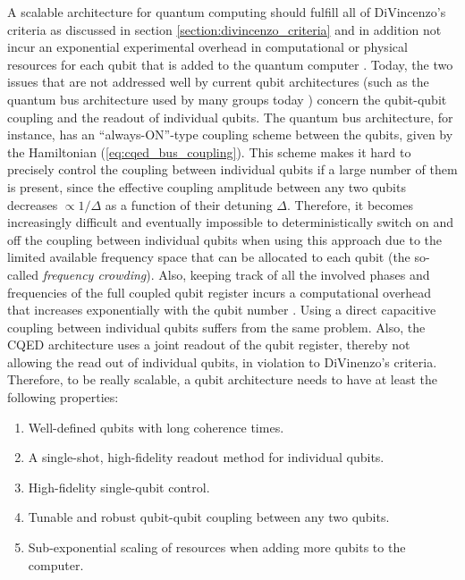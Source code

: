 A scalable architecture for quantum computing should fulfill all of DiVincenzo's criteria as discussed in section \ref{section:divincenzo_criteria} and in addition not incur an exponential experimental overhead in computational or physical resources for each qubit that is added to the quantum computer \citep{blume-kohout_climbing_2002}. Today, the two issues that are not addressed well by current qubit architectures (such as the quantum bus architecture used by many groups today \citep{dicarlo_demonstration_2009,wallraff_strong_2004}) concern the qubit-qubit coupling and the readout of individual qubits. The quantum bus architecture, for instance, has an ``always-ON''-type coupling scheme between the qubits, given by the Hamiltonian (\ref{eq:cqed_bus_coupling}). This scheme makes it hard to precisely control the coupling between individual qubits if a large number of them is present, since the effective coupling amplitude between any two qubits decreases $\propto 1/\Delta$ as a function of their detuning $\Delta$. Therefore, it becomes increasingly difficult and eventually impossible to deterministically switch on and off the coupling between individual qubits when using this approach due to the limited available frequency space that can be allocated to each qubit (the so-called {\it frequency crowding}). Also, keeping track of all the involved phases and frequencies of the full coupled qubit register incurs a computational overhead that increases exponentially with the qubit number \citep{galiautdinov_resonatorzero-qubit_2012}. Using a direct capacitive coupling between individual qubits suffers from the same problem. Also, the CQED architecture uses a joint readout of the qubit register, thereby not allowing the read out of individual qubits, in violation to DiVinenzo's criteria. Therefore, to be really scalable, a qubit architecture needs to have at least the following properties:

\begin{enumerate}
\item Well-defined qubits with long coherence times.
\item A single-shot, high-fidelity readout method for individual qubits.
\item High-fidelity single-qubit control.
\item Tunable and robust qubit-qubit coupling between any two qubits.
\item Sub-exponential scaling of resources when adding more qubits to the computer.
\end{enumerate}

